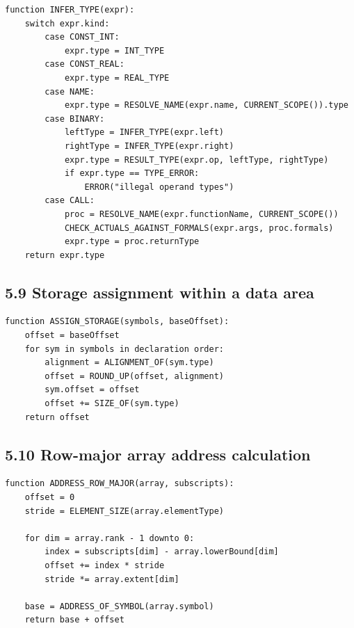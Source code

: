 \documentclass[10pt,letterpaper]{article}
\begin{document}
\begin{verbatim}
function INFER_TYPE(expr):
    switch expr.kind:
        case CONST_INT:
            expr.type = INT_TYPE
        case CONST_REAL:
            expr.type = REAL_TYPE
        case NAME:
            expr.type = RESOLVE_NAME(expr.name, CURRENT_SCOPE()).type
        case BINARY:
            leftType = INFER_TYPE(expr.left)
            rightType = INFER_TYPE(expr.right)
            expr.type = RESULT_TYPE(expr.op, leftType, rightType)
            if expr.type == TYPE_ERROR:
                ERROR("illegal operand types")
        case CALL:
            proc = RESOLVE_NAME(expr.functionName, CURRENT_SCOPE())
            CHECK_ACTUALS_AGAINST_FORMALS(expr.args, proc.formals)
            expr.type = proc.returnType
    return expr.type
\end{verbatim}

\subsection*{5.9 Storage assignment within a data area}
{}

\begin{verbatim}
function ASSIGN_STORAGE(symbols, baseOffset):
    offset = baseOffset
    for sym in symbols in declaration order:
        alignment = ALIGNMENT_OF(sym.type)
        offset = ROUND_UP(offset, alignment)
        sym.offset = offset
        offset += SIZE_OF(sym.type)
    return offset
\end{verbatim}

\subsection*{5.10 Row-major array address calculation}
{}

\begin{verbatim}
function ADDRESS_ROW_MAJOR(array, subscripts):
    offset = 0
    stride = ELEMENT_SIZE(array.elementType)

    for dim = array.rank - 1 downto 0:
        index = subscripts[dim] - array.lowerBound[dim]
        offset += index * stride
        stride *= array.extent[dim]

    base = ADDRESS_OF_SYMBOL(array.symbol)
    return base + offset
\end{verbatim}
\end{document}
